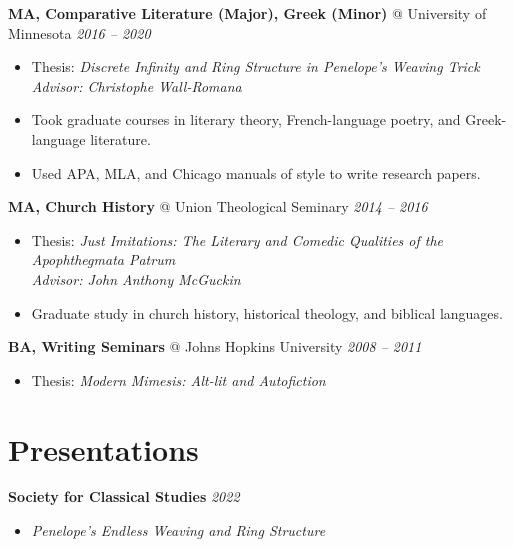 \documentclass[10pt,letterpaper]{article}
\begin{document}
\vspace{0.4em}
\noindent\textbf{MA, Comparative Literature (Major), Greek (Minor)} @ University of Minnesota \hfill \textit{2016 -- 2020}
\begin{itemize}[leftmargin=1.3em, itemsep=1.5pt, parsep=0pt, topsep=2pt]
    \item Thesis: \textit{Discrete Infinity and Ring Structure in Penelope's Weaving Trick}\\
    \textit{Advisor: Christophe Wall-Romana}
    \item Took graduate courses in literary theory, French-language poetry, and Greek-language literature.
    \item Used APA, MLA, and Chicago manuals of style to write research papers.
\end{itemize}

\vspace{0.4em}
\noindent\textbf{MA, Church History} @ Union Theological Seminary \hfill \textit{2014 -- 2016}
\begin{itemize}[leftmargin=1.3em, itemsep=1.5pt, parsep=0pt, topsep=2pt]
    \item Thesis: \textit{Just Imitations: The Literary and Comedic Qualities of the Apophthegmata Patrum}\\
    \textit{Advisor: John Anthony McGuckin}
    \item Graduate study in church history, historical theology, and biblical languages.
\end{itemize}

\vspace{0.4em}
\noindent\textbf{BA, Writing Seminars} @ Johns Hopkins University \hfill \textit{2008 -- 2011}
\begin{itemize}[leftmargin=1.3em, itemsep=1.5pt, parsep=0pt, topsep=2pt]
    \item Thesis: \textit{Modern Mimesis: Alt-lit and Autofiction}
\end{itemize}

\section*{Presentations}

\noindent\textbf{Society for Classical Studies} \hfill \textit{2022}
\begin{itemize}[leftmargin=1.3em, itemsep=1.5pt, parsep=0pt, topsep=2pt]
    \item \textit{Penelope's Endless Weaving and Ring Structure}
\end{itemize}
\end{document}
